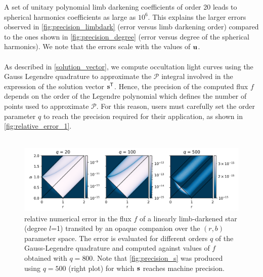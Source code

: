 \documentclass[modern]{aastex631}
\begin{document}
A set of unitary polynomial limb darkening coefficients of order 20 leads to spherical harmonics coefficients as large as $10^6$. This explains the larger errors observed in \autoref{fig:precision_limbdark} (error versus limb darkening order) compared to the ones shown in \autoref{fig:precision_degree} (error versus degree of the spherical harmonics). We note that the errors scale with the values of ${\mathbf{u}}$.\\\\
As described in \autoref{solution_vector}, we compute occultation light curves using the Gauss Legendre quadrature to approximate the $\mathcal{P}$ integral involved in the expression of the solution vector ${\mathbf{s}}^\mathsf{T}$. Hence, the precision of the computed flux $f$ depends on the order of the Legendre polynomial which defines the number of points used to approximate $\mathcal{P}$. For this reason, users must carefully set the order parameter $q$ to reach the precision required for their application, as shown in \autoref{fig:relative_error_1}.\\\\
\begin{figure}[H]
    \begin{center}
        \includegraphics[width=\textwidth]{../workflows/precision/figures/br_error.png}
        \caption{relative numerical error in the flux $f$ of a linearly limb-darkened star (degree $l$=1) transited by an opaque companion over the $(r, b)$ parameter space. The error is evaluated for different orders $q$ of the Gauss-Legendre quadrature and computed against values of $f$ obtained with $q=800$. Note that \autoref{fig:precision_s} was produced using $q=500$ (right plot) for which ${\mathbf{s}}$ reaches machine precision. }
        \label{fig:relative_error_1}
    \end{center}
\end{figure}
\end{document}
